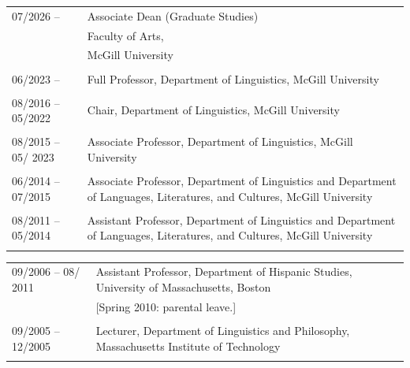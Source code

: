 \documentclass[11pt]{article}
\begin{document}
\begin{tabular}{p{2.815cm}p{280pt}}
07/2026 -- & Associate Dean (Graduate Studies)\\ & Faculty of Arts, \\ &McGill University\\
 & \\[-8pt]
06/2023 -- & Full Professor, Department of Linguistics, McGill University\\
  & \\[-8pt]
08/2016 -- 05/2022 &  Chair, Department of Linguistics, McGill University\\
 & \\[-8pt]
08/2015 -- 05/ 2023& Associate Professor, Department of Linguistics, McGill University\\
  & \\[-8pt]
06/2014 -- 07/2015&  Associate Professor, Department of Linguistics and Department of Languages, Literatures, and Cultures, McGill University\\
& \\[-8pt]
08/2011 -- 05/2014&  Assistant Professor, Department of Linguistics and Department of Languages, Literatures, and Cultures, McGill University\\
& \\[-8pt]
\end{tabular}
\begin{tabular}{p{2.815cm}p{280pt}}
09/2006 -- 08/ 2011& Assistant Professor, Department of
Hispanic Studies, University of Massachusetts, Boston\\
 &  \footnotesize{[Spring 2010: parental leave.]}\\
& \\[-8pt]
09/2005 -- 12/2005 & Lecturer, Department of Linguistics and Philosophy, Massachusetts Institute of Technology\\
& \\[-16pt]
\end{tabular}
\end{document}
